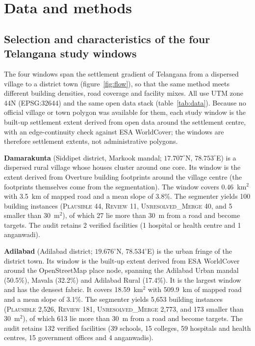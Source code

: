 \documentclass[10pt,a4paper,twocolumn]{article}
\begin{document}
\section{Data and methods}\label{sec:data}
\subsection{Selection and characteristics of the four Telangana study windows}
The four windows span the settlement gradient of Telangana from a dispersed village to a district town (figure~\ref{fig:flow}), so that the same method meets different building densities, road coverage and facility mixes. All use UTM zone 44N (EPSG:32644) and the same open data stack (table~\ref{tab:data}). Because no official village or town polygon was available for them, each study window is the built-up settlement extent derived from open data around the settlement centre, with an edge-continuity check against ESA WorldCover; the windows are therefore settlement extents, not administrative polygons.

\textbf{Damarakunta} (Siddipet district, Markook mandal; $17.707^{\circ}$N, $78.753^{\circ}$E) is a dispersed rural village whose houses cluster around one core. Its window is the extent derived from Overture building footprints around the village centre (the footprints themselves come from the segmentation). The window covers 0.46~km$^2$ with 3.5~km of mapped road and a mean slope of 3.8\%. The segmenter yields 100 building instances (\textsc{Plausible} 44, \textsc{Review} 11, \textsc{Unresolved\_Merge} 40, and 5 smaller than 30~m$^2$), of which 27 lie more than 30~m from a road and become targets. The audit retains 2 verified facilities (1 hospital or health centre and 1 anganwadi). 

\textbf{Adilabad} (Adilabad district; $19.676^{\circ}$N, $78.534^{\circ}$E) is the urban fringe of the district town. Its window is the built-up extent derived from ESA WorldCover around the OpenStreetMap place node, spanning the Adilabad Urban mandal (50.5\%), Mavala (32.2\%) and Adilabad Rural (17.4\%). It is the largest window and has the densest fabric. It covers 18.59~km$^2$ with 509.9~km of mapped road and a mean slope of 3.1\%. The segmenter yields 5{,}653 building instances (\textsc{Plausible} 2{,}526, \textsc{Review} 181, \textsc{Unresolved\_Merge} 2{,}773, and 173 smaller than 30~m$^2$), of which 613 lie more than 30~m from a road and become targets. The audit retains 132 verified facilities (39 schools, 15 colleges, 59 hospitals and health centres, 15 government offices and 4 anganwadis). 
\end{document}
